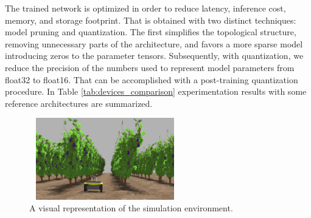 \documentclass[journal]{IEEEtran}
\begin{document}
The trained network is optimized in order to reduce latency, inference cost, memory, and storage footprint. That is obtained with two distinct techniques: model
pruning and quantization. The first simplifies the topological structure, removing unnecessary parts of the architecture, and favors a more sparse model introducing
zeros to the parameter tensors. Subsequently, with
quantization, we reduce the precision of the numbers used
to represent model parameters from float32 to float16. That can be accomplished with a post-training quantization procedure.
In Table \ref{tab:devices_comparison} experimentation results with some reference architectures are summarized.


\begin{figure}[!ht]
\centering
\includegraphics[width=2.6in,height=1.4in]{plane_vineyard_front.png}
\caption{A visual representation of the simulation environment.}
\label{fig:sim_vineyard}
\end{figure}
\end{document}
